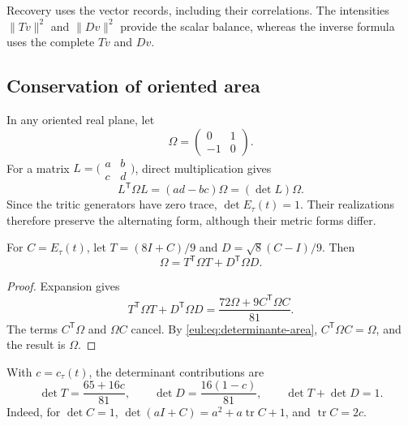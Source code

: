 Recovery uses the vector records, including their correlations. The intensities \(\|Tv\|^2\) and \(\|Dv\|^2\) provide the scalar balance, whereas the inverse formula uses the complete \(Tv\) and \(Dv\).

\subsection{Conservation of oriented area}
\label{eul:area}

In any oriented real plane, let
\[
 \Omega=\begin{pmatrix}0&1\\-1&0\end{pmatrix}.
\]
For a matrix \(L=\bigl(\begin{smallmatrix}a&b\\c&d\end{smallmatrix}\bigr)\), direct multiplication gives
\begin{equation}
 L^\mathsf T\Omega L=(ad-bc)\Omega=(\det L)\Omega.
\label{eul:eq:determinante-area}
\end{equation}
Since the tritic generators have zero trace, \(\det E_\tau(t)=1\). Their realizations therefore preserve the alternating form, although their metric forms differ.

\begin{teorema}
\label{eul:teo:area} For \(C=E_\tau(t)\), let \(T=(8I+C)/9\) and \(D=\sqrt8(C-I)/9\). Then
\begin{equation}
 \Omega=T^\mathsf T\Omega T+D^\mathsf T\Omega D.
\label{eul:eq:balance-area}
\end{equation}
\end{teorema}
\begin{proof}
Expansion gives
\[
 T^\mathsf T\Omega T+D^\mathsf T\Omega D
 =\frac{72\Omega+9C^\mathsf T\Omega C}{81}.
\]
The terms \(C^\mathsf T\Omega\) and \(\Omega C\) cancel. By \eqref{eul:eq:determinante-area}, \(C^\mathsf T\Omega C=\Omega\), and the result is \(\Omega\).
\end{proof}

With \(c=c_\tau(t)\), the determinant contributions are
\begin{equation}
 \det T=\frac{65+16c}{81},\qquad
 \det D=\frac{16(1-c)}{81},\qquad
 \det T+\det D=1.
\label{eul:eq:determinantes}
\end{equation}
Indeed, for \(\det C=1\), \(\det(aI+C)=a^2+a\operatorname{tr}C+1\), and \(\operatorname{tr}C=2c\).

